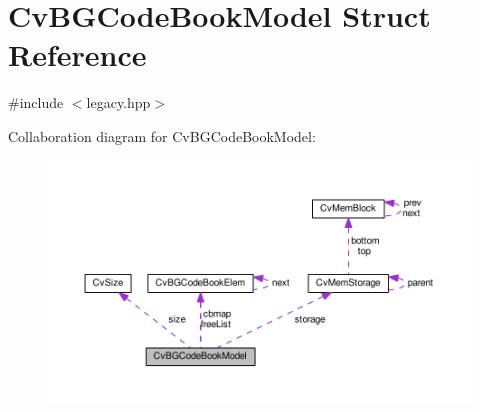 \hypertarget{structCvBGCodeBookModel}{\section{Cv\-B\-G\-Code\-Book\-Model Struct Reference}
\label{structCvBGCodeBookModel}
}


{\ttfamily \#include $<$legacy.\-hpp$>$}



Collaboration diagram for Cv\-B\-G\-Code\-Book\-Model\-:\nopagebreak
\begin{figure}[H]
\begin{center}
\leavevmode
\includegraphics[width=350pt]{structCvBGCodeBookModel__coll__graph}
\end{center}
\end{figure}
